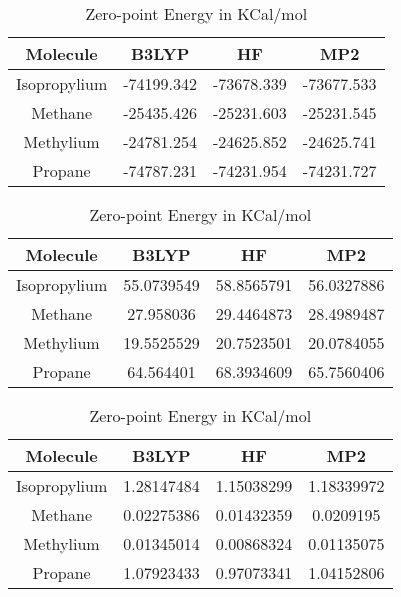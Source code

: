\clearpage
\begin{table}[htbp]
\caption{Raw data obtained for Equation 0}\label{tab:reaction-2-raw}
\vspace*{1 cm}
\begin{subtable}[h]{\textwidth}
\centering
\begin{tabular}{|c|c|c|c|}
\hline
Molecule     & B3LYP      & HF         & MP2        \\ \hline
Isopropylium & -74199.342 & -73678.339 & -73677.533 \\
Methane      & -25435.426 & -25231.603 & -25231.545 \\
Methylium    & -24781.254 & -24625.852 & -24625.741 \\
Propane      & -74787.231 & -74231.954 & -74231.727 \\ \hline
\end{tabular}
\caption{Internal Energy in KCal/mol}
\end{subtable}
\vspace{\fill}
\begin{subtable}[h]{\textwidth}
\vspace*{1 cm}
\centering
\begin{tabular}{|c|c|c|c|}
\hline
Molecule     & B3LYP      & HF         & MP2        \\ \hline
Isopropylium & 55.0739549 & 58.8565791 & 56.0327886 \\
Methane      & 27.958036  & 29.4464873 & 28.4989487 \\
Methylium    & 19.5525529 & 20.7523501 & 20.0784055 \\
Propane      & 64.564401  & 68.3934609 & 65.7560406 \\ \hline
\end{tabular}
\caption{Zero-point Energy in KCal/mol}
\end{subtable}
\vspace{\fill}
\begin{subtable}[h]{\textwidth}
\vspace*{1 cm}
\centering
\begin{tabular}{|c|c|c|c|}
\hline
Molecule     & B3LYP      & HF         & MP2        \\ \hline
Isopropylium & 1.28147484 & 1.15038299 & 1.18339972 \\
Methane      & 0.02275386 & 0.01432359 & 0.0209195  \\
Methylium    & 0.01345014 & 0.00868324 & 0.01135075 \\
Propane      & 1.07923433 & 0.97073341 & 1.04152806 \\ \hline

\end{tabular}
\end{subtable}
\end{table}
